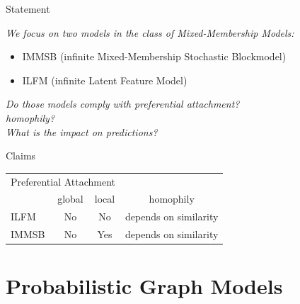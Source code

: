 %
%
%
%

\begin{frame}[t]{Statement}
    \vspace{3em}

    \textit{\Large{We focus on two models in the class of Mixed-Membership Models: }}
    \begin{itemize}
        \item IMMSB (infinite Mixed-Membership Stochastic Blockmodel)
        \item ILFM (infinite Latent Feature Model) 
    \end{itemize}

    \vspace{2em}

    \textit{\Large{Do those models comply with preferential attachment?}}\\
    \vspace{1em}
    \textit{\Large{homophily?}}\\
    \vspace{1em}
    \textit{\Large{What is the impact on predictions?}}


\pause

\begin{block}{Claims}
\begin{tabular}{l|cc|c}

    \multicolumn{3}{c}{\hspace{1.3cm}Preferential Attachment}   \\
    \cmidrule(l){2-3} 
    &   global & local  &   homophily      \\
    \hline
    ILFM       & \cellcolor{red!25}No & \cellcolor{red!25}No   & depends on similarity  \\
    IMMSB       & \cellcolor{red!25}No & \cellcolor{green!25}Yes  & depends on similarity \\
\end{tabular}
\end{block}

\end{frame}

\section{Probabilistic Graph Models}

%
%

